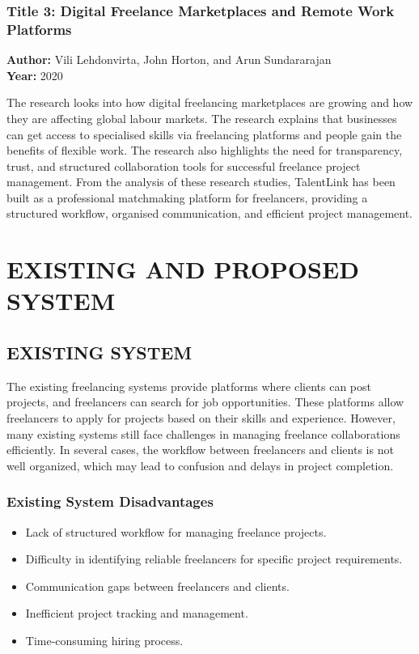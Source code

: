 \documentclass[12pt,a4paper,oneside]{report}
\numberwithin{figure}{chapter}
\numberwithin{table}{chapter}
\begin{document}
\subsection{Title 3: Digital Freelance Marketplaces and Remote Work Platforms}

\noindent\textbf{Author:} Vili Lehdonvirta, John Horton, and Arun Sundararajan\\
\textbf{Year:} 2020

The research looks into how digital freelancing marketplaces are growing and how they are
affecting global labour markets. The research explains that businesses can get access to
specialised skills via freelancing platforms and people gain the benefits of flexible
work. The research also highlights the need for transparency, trust, and structured
collaboration tools for successful freelance project management. From the analysis of
these research studies, TalentLink has been built as a professional matchmaking platform
for freelancers, providing a structured workflow, organised communication, and efficient
project management.

\chapter{EXISTING AND PROPOSED SYSTEM}

\section{EXISTING SYSTEM}

The existing freelancing systems provide platforms where clients can post projects, and
freelancers can search for job opportunities. These platforms allow freelancers to apply
for projects based on their skills and experience. However, many existing systems still
face challenges in managing freelance collaborations efficiently. In several cases, the
workflow between freelancers and clients is not well organized, which may lead to
confusion and delays in project completion.

\subsection{Existing System Disadvantages}

\begin{itemize}[leftmargin=2em]
  \item Lack of structured workflow for managing freelance projects.
  \item Difficulty in identifying reliable freelancers for specific project requirements.
  \item Communication gaps between freelancers and clients.
  \item Inefficient project tracking and management.
  \item Time-consuming hiring process.
\end{itemize}
\end{document}
